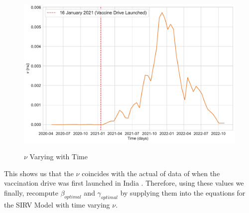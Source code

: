 \documentclass[tikz,fleqn,12pt]{wlscirep}
\begin{document}
\begin{figure}[htbp!]
  \centering
  \caption{$\nu$ Varying with Time}
  \includegraphics[width=\linewidth]{images/interpolated_nu_varying_with_time_IND.pdf}
  \label{fig:interpolated_nu_varying_with_time_IND}
\end{figure}

This shows us that the $\nu$ coincides with the actual of data of when the vaccination drive was first launched in India \cite{UnicefCovidVaccine,PIBCovidVaccine,WikipediaCovidVaccine}. Therefore, using these values we finally, recompute $\beta_{optimal}$ and $\gamma_{optimal}$ by supplying them into the equations for the SIRV Model with time varying $\nu$.
\end{document}
